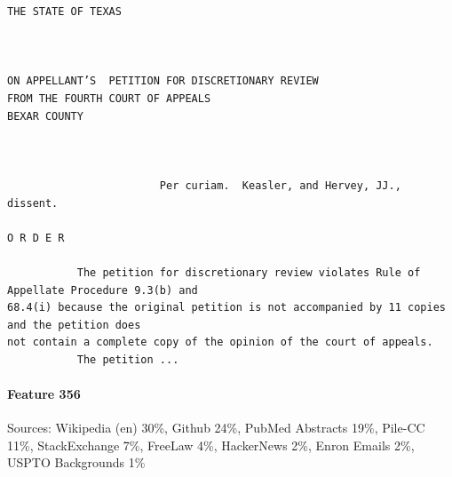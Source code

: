 \begin{verbatim}
THE STATE OF TEXAS



ON APPELLANT’S  PETITION FOR DISCRETIONARY REVIEW
FROM THE FOURTH COURT OF APPEALS
BEXAR COUNTY



                        Per curiam.  Keasler, and Hervey, JJ., dissent.

O R D E R 

           The petition for discretionary review violates Rule of Appellate Procedure 9.3(b) and
68.4(i) because the original petition is not accompanied by 11 copies and the petition does
not contain a complete copy of the opinion of the court of appeals.
           The petition ...

\end{verbatim}

\paragraph*{Feature 356} Sources: Wikipedia (en) 30\%, Github 24\%, PubMed Abstracts 19\%, Pile-CC 11\%, StackExchange 7\%, FreeLaw 4\%, HackerNews 2\%, Enron Emails 2\%, USPTO Backgrounds 1\%

